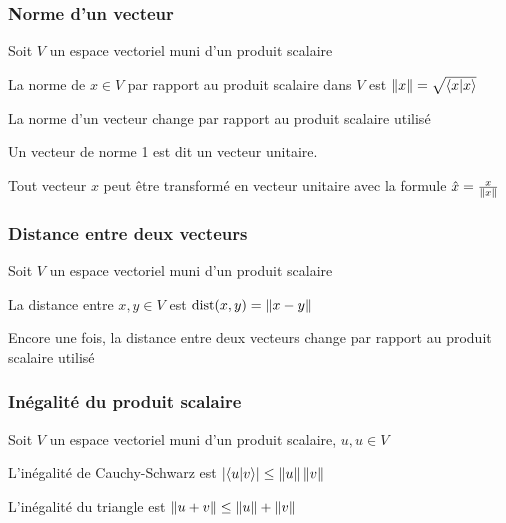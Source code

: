 \subsubsection{Norme d'un vecteur}
Soit $V$ un espace vectoriel muni d'un produit scalaire
\begin{definition}
      La norme de $x \in V$ par rapport au produit scalaire dans $V$ est $\left\lVert x\right\rVert = \sqrt{\langle x \lvert x \rangle}$
\end{definition}
\begin{remark}
      La norme d'un vecteur change par rapport au produit scalaire utilisé
\end{remark}
\begin{definition}
      Un vecteur de norme 1 est dit un vecteur unitaire.
\end{definition}
\begin{lemma}
      Tout vecteur $x$ peut être transformé en vecteur unitaire avec la formule $\hat{x} = \frac{x}{\left\lVert x\right\rVert}$
\end{lemma}

\subsubsection{Distance entre deux vecteurs}
Soit $V$ un espace vectoriel muni d'un produit scalaire
\begin{definition}
      La distance entre $x, y \in V$ est $\text{dist}(x, y) = \left\lVert x - y\right\rVert$
\end{definition}
\begin{remark}
      Encore une fois, la distance entre deux vecteurs change par rapport au produit scalaire utilisé
\end{remark}

\subsubsection{Inégalité du produit scalaire}
Soit $V$ un espace vectoriel muni d'un produit scalaire, $u, u \in V$
\begin{theorem}
      L'inégalité de Cauchy-Schwarz est $\left|\langle u \lvert v \rangle\right| \leq \left\lVert u\right\rVert\left\lVert v\right\rVert$
\end{theorem}
\begin{theorem}
      L'inégalité du triangle est $\left\lVert u + v\right\rVert \leq \left\lVert u\right\rVert + \left\lVert v\right\rVert$
\end{theorem}

